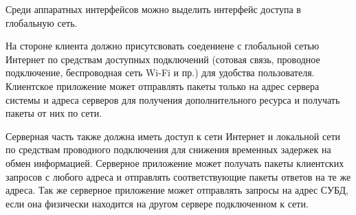 Среди аппаратных интерфейсов можно выделить интерфейс доступа в глобальную сеть. 

На стороне клиента должно присутсвовать соедениене с глобальной сетью Интернет по средствам доступных подключений (сотовая связь, проводное подключение, беспроводная сеть Wi-Fi и пр.) для удобства пользователя. Клиентское приложение может отправлять пакеты только на адрес сервера системы и адреса серверов для получения дополнительного ресурса и получать пакеты от них по сети.

Серверная часть также должна иметь доступ к сети Интернет и локальной сети по средствам проводного подключения для снижения временных задержек на обмен информацией. Серверное приложение может получать пакеты клиентских запросов с любого адреса и отправлять соответствующие пакеты ответов на те же адреса. Так же серверное приложение может отправлять запросы на адрес СУБД, если она физически находится на другом сервере подключенном к сети.

